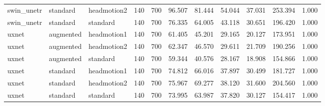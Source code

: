 \begin{table}
\begin{tabular}{lllrrrrrrrr}
swin\_unetr & standard & headmotion2 & 140 & 700 & 96.507 & 81.444 & 54.044 & 37.031 & 253.394 & 1.000 \\
swin\_unetr & standard & standard & 140 & 700 & 76.335 & 64.005 & 43.118 & 30.651 & 196.420 & 1.000 \\
uxnet & augmented & headmotion1 & 140 & 700 & 61.405 & 45.201 & 29.165 & 20.127 & 173.951 & 1.000 \\
uxnet & augmented & headmotion2 & 140 & 700 & 62.347 & 46.570 & 29.611 & 21.709 & 190.256 & 1.000 \\
uxnet & augmented & standard & 140 & 700 & 59.344 & 40.576 & 28.167 & 18.908 & 154.866 & 1.000 \\
uxnet & standard & headmotion1 & 140 & 700 & 74.812 & 66.016 & 37.897 & 30.499 & 181.727 & 1.000 \\
uxnet & standard & headmotion2 & 140 & 700 & 75.967 & 69.277 & 38.120 & 31.600 & 204.560 & 1.000 \\
uxnet & standard & standard & 140 & 700 & 73.995 & 63.987 & 37.820 & 30.127 & 154.417 & 1.000 \\
\bottomrule
\end{tabular}
\end{table}
